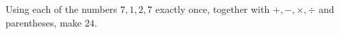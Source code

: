 Using each of the numbers $7,1,2,7$ exactly once, together with $+,-,\times,\div$ and parentheses, make $24$.
